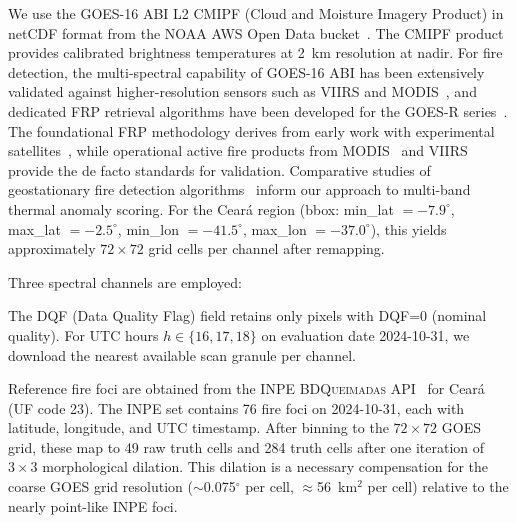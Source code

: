 \documentclass[5p,twocolumn]{elsarticle}
\newcommand{\abbrev}[1]{{\small\textsc{#1}}}
\begin{document}
We use the \abbrev{GOES-16} \abbrev{ABI} L2 \abbrev{CMIPF} (Cloud and Moisture Imagery Product) in netCDF format from the \abbrev{NOAA} AWS Open Data bucket~\cite{noaa2025}. The \abbrev{CMIPF} product provides calibrated brightness temperatures at 2~km resolution at nadir. For fire detection, the multi-spectral capability of \abbrev{GOES-16} \abbrev{ABI} has been extensively validated against higher-resolution sensors such as \abbrev{VIIRS} and \abbrev{MODIS}~\cite{zhang2022_goes16}, and dedicated \abbrev{FRP} retrieval algorithms have been developed for the GOES-R series~\cite{xu2020_goesfrp}. The foundational \abbrev{FRP} methodology derives from early work with experimental satellites~\cite{wooster2003_frp}, while operational active fire products from \abbrev{MODIS}~\cite{giglio2016_modis} and \abbrev{VIIRS}~\cite{schroeder2014_viiirs} provide the de facto standards for validation. Comparative studies of geostationary fire detection algorithms~\cite{hally2017_fire} inform our approach to multi-band thermal anomaly scoring. For the Cear\'{a} region (bbox: min\_lat $= -7.9^\circ$, max\_lat $= -2.5^\circ$, min\_lon $= -41.5^\circ$, max\_lon $= -37.0^\circ$), this yields approximately $72\times 72$ grid cells per channel after remapping.

Three spectral channels are employed:

\begin{table}[htbp]
\centering
\caption{\abbrev{GOES-16} \abbrev{ABI} spectral channels used.}
\label{tab:channels}
\small
{}
\end{table}

The \abbrev{DQF} (Data Quality Flag) field retains only pixels with \abbrev{DQF}=0 (nominal quality). For UTC hours $h \in \{16, 17, 18\}$ on evaluation date 2024-10-31, we download the nearest available scan granule per channel.

Reference fire foci are obtained from the \abbrev{INPE} \abbrev{BDQueimadas} \abbrev{API}~\cite{inpe_bdqueimadas2025} for Cear\'{a} (UF code 23). The \abbrev{INPE} set contains 76 fire foci on 2024-10-31, each with latitude, longitude, and UTC timestamp. After binning to the $72\times 72$ \abbrev{GOES} grid, these map to 49 raw truth cells and 284 truth cells after one iteration of $3\times 3$ morphological dilation. This dilation is a necessary compensation for the coarse \abbrev{GOES} grid resolution ($\sim$0.075$^\circ$ per cell, $\approx$56~km$^2$ per cell) relative to the nearly point-like \abbrev{INPE} foci.
\end{document}
